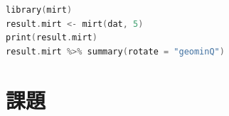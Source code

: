 \documentclass{ltjsbook}
\begin{document}
\begin{lstlisting}[language=c++,label={code::11_06b},caption={mirtの実行}]
library(mirt)
result.mirt <- mirt(dat, 5)
print(result.mirt)
result.mirt %>% summary(rotate = "geominQ")
\end{lstlisting}


\section{課題}
\end{document}
